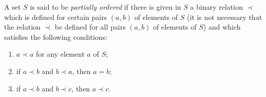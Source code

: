 A set $S$ is said to be \textit{partially ordered} if there is given in $S$ a binary relation $\prec$ which is defined for certain pairs $(a, b)$ of elements of $S$ (it is not necessary that the relation $\prec$ be defined for all pairs $(a, b)$ of elements of $S$) and which satisfies the following conditions:
\begin{enumerate}
\item[(1)] $a \prec a$ for any element $a$ of $S$;
\item[(2)] if $a \prec b$ and $b \prec a$, then $a = b$;
\item[(3)] if $a \prec b$ and $b \prec c$, then $a \prec c$.
\end{enumerate}
